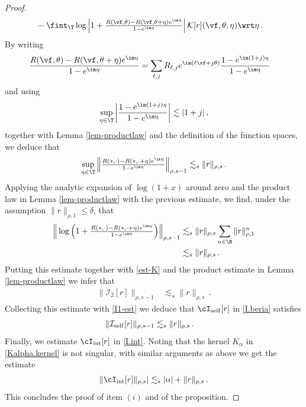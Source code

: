 \documentclass[a4paper,reqno,10pt]{article}
\begin{document}
\begin{proof}
\begin{align*}
&-\fint_{\T} \log \left| 1+\tfrac{R(\vf,\theta)  - R(\vf,\theta+\eta) e^{\im\eta}}{1-e^{\im\eta}} \right|  \mathcal{K}[r](\vf,\theta,\eta)\wrt \eta \,.
    \end{align*}
    By writing
    \begin{align*}
 \frac{R(\vf,\theta)  - R(\vf,\theta+\eta) e^{\im\eta}}{1-e^{\im\eta}}&=\sum_{\ell,j} R_{\ell,j}e^{\im(\ell\vf+j\theta)}  \frac{1-e^{\im (1+j)\eta}}{1-e^{\im\eta}} 
\end{align*}
and using 
$$
\sup_{\eta\in\T}\left|\frac{1-e^{\im (1+j)\eta}}{1-e^{\im\eta}}\right|\lesssim |1+j| \,,
$$
together with Lemma \ref{lem-productlaw} and the definition of the function spaces, we deduce that
\begin{align*}
 \sup_{\eta\in\T}\Big\|\tfrac{R(*,\cdot)  - R(*,\cdot+\eta) e^{\im\eta}}{1-e^{\im\eta}}\Big\|_{\rho,s-1}\lesssim_s \|r\|_{\rho,s} \,.  
\end{align*}
 Applying  the analytic expansion of $\log(1+x)$ around zero and the product law in Lemma \ref{lem-productlaw} with the previous estimate, we find, under the assumption $ \|r\|_{\rho,1}\leqslant \delta$,
 that
 \begin{align*}
 \Big\|\log\Big(1+\tfrac{R(*,\cdot)  - R(*,\cdot+\eta) e^{\im\eta}}{1-e^{\im\eta}}\Big)\Big\|_{\rho,s-1}&\lesssim_s \|r\|_{\rho,s}\sum_{n\in\N}\|r\|_{\rho,1}^n   \\
 &\lesssim_s \|r\|_{\rho,s} \,.
\end{align*}
 Putting this estimate together with \eqref{est-K} and the product estimate in Lemma \ref{lem-productlaw} we infer that
  \begin{align*}
    \|\mathcal{I}_2[r]\|_{\rho,s-1}& \lesssim_{s} \|r\|_{\rho,s} \,.
    \end{align*}
    Collecting this estimate with \eqref{I1-est} we deduce that $\cI_{\rm self}[r]$ in \eqref{I.beria} satisfies
    \begin{align*}
    \|\mathcal{I}_{\rm self}[r]\|_{\rho,s-1}&\lesssim_s \|r\|_{\rho,s} \,.
    \end{align*}
    Finally, we estimate $\cI_{\rm int}[r]$ in \eqref{I.int}. Noting that the kernel $K_{\alpha}$ in \eqref{Kalpha.kernel} is not singular, with similar arguments as above we get the estimate
    \begin{align}
    \| \cI_{\rm int}[r] \|_{\rho,s}|\lesssim_s |\alpha|+\|r\|_{\rho,s}\,.
   \end{align}
   This concludes the proof of item $(i)$ and of the proposition.
\end{proof}
\end{document}
